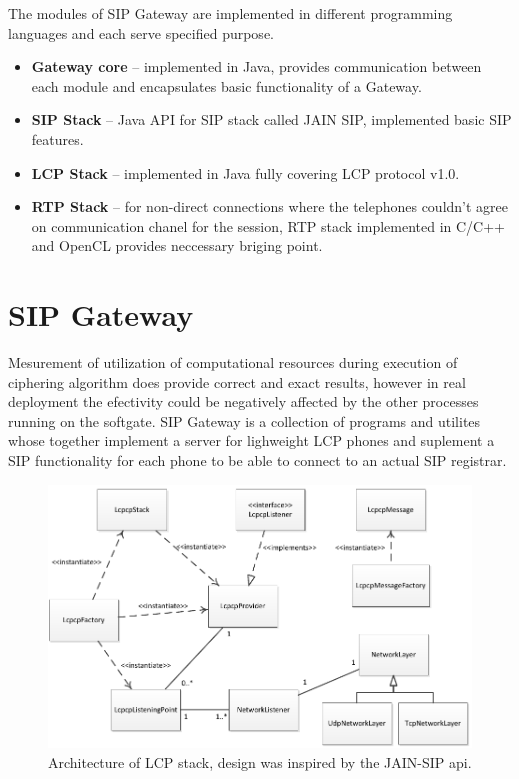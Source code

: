 The modules of SIP Gateway are implemented in different programming languages
and each serve specified purpose.
\begin{itemize}
\item \textbf{Gateway core} -- implemented in Java, provides communication 
between each module and encapsulates basic functionality of a Gateway.
\item \textbf{SIP Stack} -- Java API for SIP stack called JAIN SIP\cite{jainsip}, 
implemented basic SIP features.
\item \textbf{LCP Stack} -- implemented in Java fully covering LCP protocol v1.0.
\item \textbf{RTP Stack} -- for non-direct connections where the telephones 
couldn't agree on communication chanel for the session, RTP stack implemented in 
C/C++ and OpenCL provides neccessary briging point.
\end{itemize}


\section{SIP Gateway}
Mesurement of utilization of computational resources during execution of 
ciphering algorithm does provide correct and exact results, however in real 
deployment the efectivity could be negatively affected by the other processes 
running on the softgate. SIP Gateway is a collection of programs and utilites
whose together implement a server for lighweight LCP phones and suplement a
SIP functionality for each phone to be able to connect to an actual SIP 
registrar. 

\begin{figure}[H]
\centering
\includegraphics[width=14cm]{fig/lcpstack.pdf}
\caption{Architecture of LCP stack, design was inspired by the JAIN-SIP 
api\cite{jainsip}.}
\label{lcpstack}
\end{figure}

